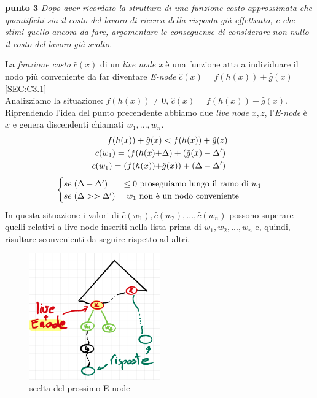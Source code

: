 \documentclass[a4paper]{article}
\begin{document}
\textbf{punto 3}
\emph{Dopo aver ricordato la struttura di una funzione costo approssimata che quantifichi sia il costo del lavoro di ricerca della risposta già effettuato, e che stimi quello ancora da fare, argomentare le conseguenze di considerare non nullo il costo del lavoro già svolto.}
\begin{adjustwidth}{.8cm}{0cm}
	La \textit{funzione costo} $\hat c(x)$ di un \textit{live node x} è una funzione atta a individuare il nodo più conveniente da far diventare \textit{E-node} $\hat c(x) = f(h(x)) + \hat g(x)$ \ref{SEC:C3.1}\\
Analizziamo la situazione: $f(h(x)) \neq 0$, $\hat c(x) = f(h(x)) + \hat g(x)$.\\
Riprendendo l'idea del punto precendente abbiamo due \textit{live node} $x,z$, l'\textit{E-node} è $x$ e genera discendenti chiamati $w_1,..., w_n$.
\begin{align}        
	f(h(x)) + \hat g(x) &< f(h(x)) + \hat g(z) \notag \\
	c(w_1) = (f(h(x) + &\Delta) + (\hat g(x) - \Delta') \notag \\
	c(w_1) = (f(h(x)) + &\hat g(x)) + (\Delta - \Delta') \notag
	\end{align}
	\begin{equation}
	\begin{cases}
		se \; (\Delta - \Delta') &\leq 0 \text{ proseguiamo lungo il ramo di $w_1$} \notag \\
		se \; (\Delta >> \Delta') &\text{ $w_1$ non è un nodo conveniente} \notag
	\end{cases}
	\end{equation}
In questa situazione i valori di $\hat c(w_1), \hat c(w_2), . . . , \hat c(w_n)$ possono superare quelli relativi a live node inseriti nella lista prima di $w_1, w_2, . . . , w_n$ e, quindi, risultare sconvenienti da seguire rispetto ad altri.\\
\begin{figure}[!ht]
\centering
\includegraphics[width=0.5\textwidth]{./img/C3_next.png}
\caption{scelta del prossimo E-node} \label{FIG:C3_next2}
\end{figure}\\
\end{adjustwidth}
\end{document}
